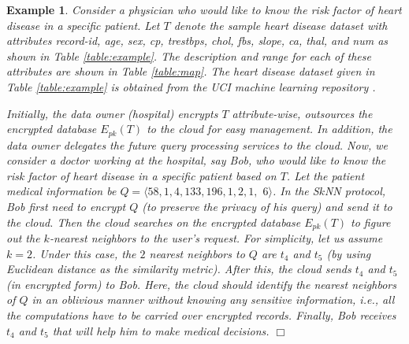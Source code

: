 \documentclass{article}
\newtheorem{example}{Example}
\begin{document}
\begin{example}\label{sec:example}
Consider a physician who would like to know the risk factor of heart disease in a specific patient.
Let $T$ denote the sample heart disease dataset with attributes \textit{record-id}, \textit{age}, \textit{sex}, \textit{cp}, 
\textit{trestbps}, \textit{chol}, \textit{fbs}, \textit{slope}, \textit{ca}, \textit{thal}, and \textit{num} 
as shown in Table \ref{table:example}. The description and range for each of these attributes 
are shown in Table \ref{table:map}. The heart disease dataset 
given in Table  \ref{table:example} is obtained from the UCI machine learning repository \cite{uci-dataset-heart}.

Initially, the data owner (hospital) encrypts $T$ attribute-wise, outsources the encrypted database $E_{pk}(T)$ 
to the cloud for easy management. In addition, the data owner delegates the future query processing 
services to the cloud. Now, we consider a doctor working at the hospital, say Bob, who would 
like to know the risk factor of heart disease in a specific 
patient based on $T$. Let the patient medical information 
be $Q = \langle 58,1, 4, 133, 196, 1, 2,1,$ $6\rangle$. In the S$k$NN protocol, Bob first need to encrypt 
$Q$ (to preserve the privacy of his query) and send it to the cloud. Then the cloud searches on the encrypted database 
$E_{pk}(T)$ to figure out the $k$-nearest neighbors to the user's request. For simplicity, 
let us assume $k=2$. Under this case, the $2$ nearest neighbors to $Q$ are $t_4$ and 
$t_5$ (by using Euclidean distance as the similarity metric). After this, the cloud 
sends $t_4$ and $t_5$ (in encrypted form) to Bob. Here, the cloud should identify the 
nearest neighbors of $Q$ in an oblivious manner without knowing any sensitive information, i.e., all 
the computations have to be carried over encrypted records. Finally, Bob receives  
$t_4$ and $t_5$ that will help him to make medical decisions. 
\hfill $\Box$
\end{example}
\end{document}
